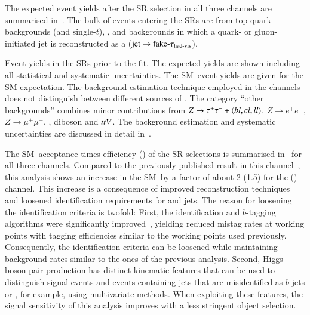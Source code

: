 The expected event yields after the SR selection in all three channels are
summarised in~. The bulk of events entering the SRs
are from top-quark backgrounds (\ttbar and single-$t$), \Zjets, and backgrounds
in which a quark- or gluon-initiated jet is reconstructed as a \tauhadvis
($\text{jet} \to \text{fake-}\tau_{\text{had-vis}}$).


\begin{table}[htbp]
  \centering

  \caption[Event yields in the SRs prior to the fit.]{Event yields in the SRs
    prior to the fit. The expected yields are shown including all statistical
    and systematic uncertainties. The SM~\HH event yields are given for the SM
    expectation. The \faketauhadvis background estimation technique employed in
    the \lephad channels does not distinguish between different sources of
    \faketauhadvis. The category ``other backgrounds'' combines minor
    contributions from $Z \to \tau^{+} \tau^{-} + (bl,cl,ll)$, $Z \to e^{+}e^{-}$,
    $Z \to \mu^{+}\mu^{-}$, \Wjets, diboson and $t\bar{t} V$. The background
    estimation and systematic uncertainties are discussed in detail
    in~.}%
  \label{tab:smhh_prefit_yields}%
  \label{tab:hadhad_presel_yields}

  \resizebox{\textwidth}{!}{
    
  }
\end{table}

The SM~\HH acceptance times efficiency (\AccTimesEff) of the SR selections is
summarised in~ for all three channels. Compared
to the previously published result in this
channel~\cite{HIGG-2016-16-witherratum}, this analysis shows an increase in the
SM~\HH \AccTimesEff by a factor of about 2 (1.5) for the \hadhad (\lephad)
channel. This increase is a consequence of improved \tauhadvis reconstruction
techniques and loosened identification requirements for \tauhadvis and \btagged
jets.
The reason for loosening the identification criteria is twofold: First, the
\tauhadvis identification and $b$-tagging algorithms were significantly
improved~\cite{ATL-PHYS-PUB-2019-033,FTAG-2019-07}, yielding reduced mistag
rates at working points with tagging efficiencies similar to the working points
used previously. Consequently, the identification criteria can be loosened while
maintaining background rates similar to the ones of the previous analysis.
Second, Higgs boson pair production has distinct kinematic features that can be
used to distinguish signal events and events containing jets that are
misidentified as $b$-jets or \tauhadvis, for example, using multivariate
methods. When exploiting these features, the signal sensitivity of this analysis
improves with a less stringent object selection.

